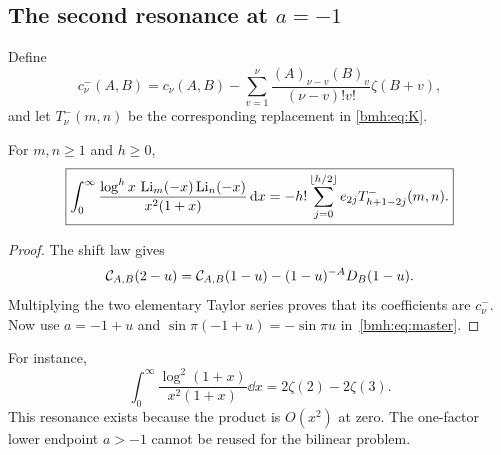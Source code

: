 \subsection{The second resonance at \texorpdfstring{$a=-1$}{a=-1}}
Define
\begin{equation}\label{bmh:eq:minus-coeff}
 c^-_\nu(A,B)=c_\nu(A,B)
 -\sum_{v=1}^{\nu}
    \frac{(A)_{\nu-v}(B)_v}{(\nu-v)!v!}\zeta(B+v),
\end{equation}
and let $T^-_\nu(m,n)$ be the corresponding replacement in
\eqref{bmh:eq:K}.

\begin{corollary}\label{bmh:cor:negative}
For $m,n\ge1$ and $h\ge0$,
\begin{equation}\label{bmh:eq:negative-jets}
 \boxed{\displaystyle
 \int_0^\infty\frac{\log^h x\,\operatorname{Li}_m(-x)\operatorname{Li}_n(-x)}{x^2(1+x)}\,\mathrm d x
 =-h!\sum_{j=0}^{\lfloor h/2\rfloor}e_{2j}T^-_{h+1-2j}(m,n).}
\end{equation}
\end{corollary}
\begin{proof}
The shift law gives
\[
 \mathcal C_{A,B}(2-u)=\mathcal C_{A,B}(1-u)-(1-u)^{-A}D_B(1-u).
\]
Multiplying the two elementary Taylor series proves that its coefficients
are $c^-_\nu$. Now use $a=-1+u$ and
$\sin\pi(-1+u)=-\sin\pi u$ in~\eqref{bmh:eq:master}.
\end{proof}
For instance,
\begin{equation}\label{bmh:eq:negative11}
 \int_0^\infty\frac{\log^2(1+x)}{x^2(1+x)}\dd x
 =2\zeta(2)-2\zeta(3).
\end{equation}
This resonance exists because the product is $O(x^2)$ at zero. The
one-factor lower endpoint $a>-1$ cannot be reused for the bilinear
problem.

